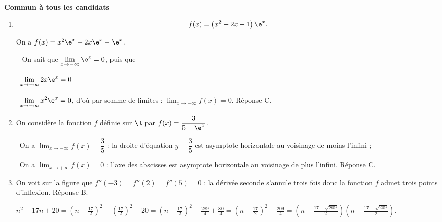 \textbf{Commun à tous les candidats}

\medskip











\begin{enumerate}
\item 

\[f(x) = \left(x^2 - 2x - 1\right)\e^x.\]






On a $f(x) = x^2\e^x - 2x\e^x - \e^x$.

\starredbullet~ On sait que $\displaystyle\lim_{x \to - \infty} \e^x = 0$, puis que 

\starredbullet~$\displaystyle\lim_{x \to - \infty} 2x\e^x = 0$

\starredbullet~$\displaystyle\lim_{x \to - \infty} x^2\e^x = 0$, d'où par somme de limites : $\displaystyle\lim_{x \to - \infty} f(x) = 0$. Réponse C.
\item  On considère la fonction $f$ définie sur $\R$ par $f(x) = \dfrac{3}{5 + \e^x}$.









\starredbullet~On a $\displaystyle\lim_{x \to - \infty} f(x) = \dfrac{3}{5}$ : la droite d'équation $y = \dfrac{3}{5}$ est asymptote horizontale au voisinage de moins l'infini ;

\starredbullet~On a $\displaystyle\lim_{x \to + \infty} f(x) = 0$ : l'axe des abscisses est asymptote horizontale au voisinage de plus l'infini. Réponse C.
\item  
















On voit sur la figure que $f''(- 3) = f''(2) = f''(5) = 0$ : la dérivée seconde s'annule trois fois donc la fonction $f$ admet trois points d'inflexion. Réponse B.








$n^2 - 17n + 20 = \left(n - \frac{17}{2} \right)^2 - \left(\frac{17}{2}\right)^2 + 20 = \left(n - \frac{17}{2} \right)^2 - \frac{289}{4} + \frac{80}{4} = \left(n - \frac{17}{2} \right)^2 - \frac{209}{4} = \left(n - \frac{17 - \sqrt{209}}{2} \right)\left(n - \frac{17 + \sqrt{209}}{2}\right).$


\end{enumerate}
